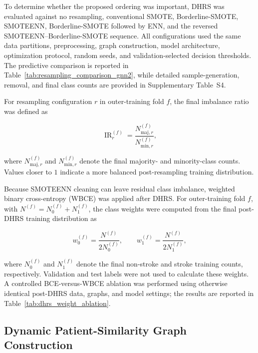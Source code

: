 \documentclass[pdflatex,sn-mathphys-num]{sn-jnl}%
\theoremstyle{thmstyleone}%
\theoremstyle{thmstyletwo}%
\theoremstyle{thmstylethree}%
\begin{document}
 {
To determine whether the proposed ordering was important, DHRS was evaluated
against no resampling, conventional SMOTE, Borderline-SMOTE, SMOTEENN,
Borderline-SMOTE followed by ENN, and the reversed
SMOTEENN--Borderline-SMOTE sequence. All configurations used the same data
partitions, preprocessing, graph construction, model architecture,
optimization protocol, random seeds, and validation-selected decision
thresholds. The predictive comparison is reported in
Table~\ref{tab:resampling_comparison_gnn2}, while detailed sample-generation,
removal, and final class counts are provided in Supplementary Table~S4.}

 {
For resampling configuration \(r\) in outer-training fold \(f\), the final
imbalance ratio was defined as
}

{ 
\begin{equation}
\operatorname{IR}_{r}^{(f)}
=
\frac{N_{\mathrm{maj},r}^{(f)}}
     {N_{\mathrm{min},r}^{(f)}},
\label{eq:final_resampling_ir}
\end{equation}
}

 {
where \(N_{\mathrm{maj},r}^{(f)}\) and
\(N_{\mathrm{min},r}^{(f)}\) denote the final majority- and minority-class
counts. Values closer to \(1\) indicate a more balanced post-resampling
training distribution.
}

 {
Because SMOTEENN cleaning can leave residual class imbalance, weighted binary
cross-entropy (WBCE) was applied after DHRS. For outer-training fold \(f\),
with \(N^{(f)}=N_0^{(f)}+N_1^{(f)}\), the class weights were computed from
the final post-DHRS training distribution as
}

{ 
\begin{equation}
w_0^{(f)}
=
\frac{N^{(f)}}{2N_0^{(f)}},
\qquad
w_1^{(f)}
=
\frac{N^{(f)}}{2N_1^{(f)}},
\label{eq:dhrs_class_weights}
\end{equation}
}

 {
where \(N_0^{(f)}\) and \(N_1^{(f)}\) denote the final non-stroke and stroke
training counts, respectively. Validation and test labels were not used to
calculate these weights. A controlled BCE-versus-WBCE ablation was performed using otherwise identical
post-DHRS data, graphs, and model settings; the results are reported in
Table~\ref{tab:dhrs_weight_ablation}.}

\subsection{Dynamic Patient-Similarity Graph Construction}
\label{subsec:graph_construction}
\end{document}
